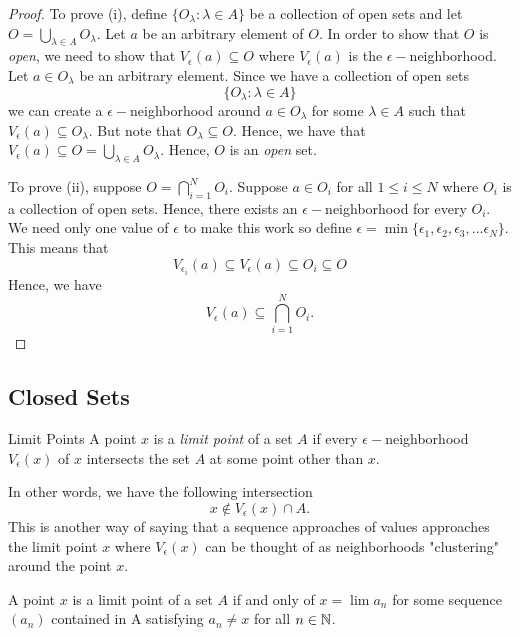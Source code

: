 \begin{proof}
    To prove (i), define \( \{ O_{\lambda} : \lambda \in A \}  \) be a collection of open sets and let \( O = \bigcup_{ \lambda \in A  } O_{\lambda} \). Let \( a  \) be an arbitrary element of \( O \). In order to show that \( O \) is \textit{open}, we need to show that \( V_{\epsilon }(a) \subseteq O \) where \( V_{\epsilon }(a) \) is the \( \epsilon - \)neighborhood. Let \(  a \in O_{\lambda} \) be an arbitrary element. Since we have a collection of open sets 
    \[ \{ O_{\lambda}  : \lambda \in A \}  \]
    we can create a \( \epsilon - \)neighborhood around \( a \in O_{\lambda}  \) for some \( \lambda \in A  \) such that \( V_{\epsilon }(a) \subseteq O_{\lambda}\). But note that \( O_{\lambda} \subseteq O \). Hence, we have that \( V_{\epsilon } (a) \subseteq O = \bigcup_{ \lambda \in A  } O_{\lambda}\). Hence, \( O \) is an \textit{open} set.
    
    To prove (ii), suppose \( O = \bigcap_{ i =1  }^{ N } O_{i}  \). Suppose \( a \in O_{i} \) for all \( 1 \leq  i \leq N \) where \( O_{i} \) is a collection of open sets. Hence, there exists an \( \epsilon- \)neighborhood for every \( O_i  \). We need only one value of \( \epsilon  \) to make this work so define \( \epsilon = \min \{ \epsilon_1, \epsilon_2, \epsilon_3, ... \epsilon_N \}  \).  This means that \[ V_{\epsilon_i} (a) \subseteq V_{\epsilon}(a) \subseteq O_{i} \subseteq O  \] 
Hence, we have 
\[ V_{\epsilon}(a) \subseteq \bigcap_{ i=1 }^{ N } O_i. \] 
\end{proof}

\subsection{Closed Sets} 

\begin{definition}{Limit Points}{}
    A point \( x \) is a \textit{limit point} of a set \( A  \) if every \( \epsilon- \)neighborhood \( V_{\epsilon }(x) \) of \( x \) intersects the set \( A  \) at some point other than \( x \). 
\end{definition}
In other words, we have the following intersection 
\[ x \notin V_{\epsilon }(x) \cap A.  \]
This is another way of saying that a sequence approaches of values approaches the limit point \( x \) where \( V_{\epsilon }(x) \) can be thought of as neighborhoods "clustering" around the point \( x \). 

\begin{theorem}{}{}
A point \( x \) is a limit point of a set \( A \) if and only of \( x = \lim a_n \) for some sequence \( (a_n) \) contained in A satisfying \( a_n \neq x  \) for all \( n \in \mathbb{N}  \). 
\end{theorem}

